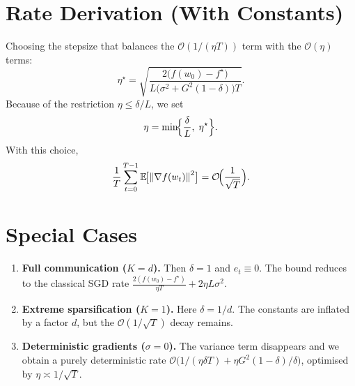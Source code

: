 \documentclass{article}
\newcommand{\E}{\mathbb{E}}
\newcommand{\norm}[1]{\left\lVert #1\right\rVert}
\begin{document}
\section*{Rate Derivation (With Constants)}
Choosing the stepsize that balances the $\mathcal{O}(1/(\eta T))$ term with the $\mathcal{O}(\eta)$ terms:
\[
\eta^\star = \sqrt{\frac{2\bigl(f(w_0)-f^\star\bigr)}{L\bigl(\sigma^2+G^2(1-\delta)\bigr)T}} .
\]
Because of the restriction $\eta\le\delta/L$, we set
\[
\eta = \min\!\Bigl\{\frac{\delta}{L},\;\eta^\star\Bigr\}.
\]
With this choice,
\[
\frac{1}{T}\sum_{t=0}^{T-1}\E\!\bigl[\norm{\nabla f(w_t)}^2\bigr]
= \mathcal{O}\!\Bigl(\frac{1}{\sqrt{T}}\Bigr).
\]

\section*{Special Cases}
\begin{enumerate}[label=(\alph*)]
\item \textbf{Full communication ($K=d$).} Then $\delta=1$ and $e_t\equiv0$.
    The bound reduces to the classical SGD rate
    $\frac{2(f(w_0)-f^\star)}{\eta T}+2\eta L\sigma^2$.
\item \textbf{Extreme sparsification ($K=1$).} Here $\delta=1/d$.
    The constants are inflated by a factor $d$, but the $\mathcal{O}(1/\sqrt{T})$ decay remains.
\item \textbf{Deterministic gradients ($\sigma=0$).}
    The variance term disappears and we obtain a purely deterministic rate
    $\mathcal{O}\bigl(1/(\eta\delta T)+\eta G^2(1-\delta)/\delta\bigr)$,
    optimised by $\eta\asymp 1/\sqrt{T}$.
\end{enumerate}
\end{document}
